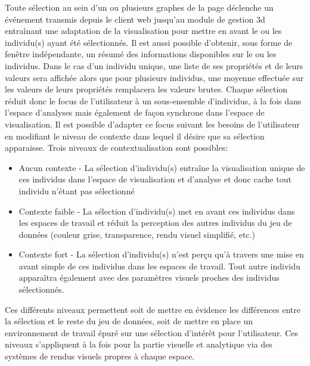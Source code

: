 Toute sélection au sein d'un ou plusieurs graphes de la page déclenche un événement transmis depuis le client web jusqu'au module de gestion 3d entraînant une adaptation de la visualisation pour mettre en avant le ou les individu(s) ayant été sélectionnés. Il est aussi possible d'obtenir, sous forme de fenêtre indépendante, un résumé des informations disponibles sur le ou les individus. Dans le cas d'un individu unique, une liste de ses propriétés et de leurs valeurs sera affichée alors que pour plusieurs individus, une moyenne effectuée sur les valeurs de leurs propriétés remplacera les valeurs brutes.
Chaque sélection réduit donc le focus de l'utilisateur à un sous-ensemble d'individus, à la fois dans l'espace d'analyses mais également de façon synchrone dans l'espace de visualisation. Il est possible d'adapter ce focus suivant les besoins de l'utilisateur en modifiant le niveau de contexte dans lequel il désire que sa sélection apparaisse. Trois niveaux de contextualisation sont possibles:
\begin{itemize}
  \item Aucun contexte - La sélection d'individu(s) entraîne la visualisation unique de ces individus dans l'espace de visualisation et d'analyse et donc cache tout individu n'étant pas sélectionné
  \item Contexte faible - La sélection d'individu(s) met en avant ces individus dans les espaces de travail et réduit la perception des autres individus du jeu de données (couleur grise, transparence, rendu visuel simplifié, etc.)
  \item Contexte fort - La sélection d'individu(s) n'est perçu qu'à travers une mise en avant simple de ces individus dans les espaces de travail. Tout autre individu apparaîtra également avec des paramètres visuels proches des individus sélectionnés.
\end{itemize}

Ces différents niveaux permettent soit de mettre en évidence les différences entre la sélection et le reste du jeu de données, soit de mettre en place un environnement de travail épuré sur une sélection d’intérêt pour l'utilisateur. Ces niveaux s'appliquent à la fois pour la partie visuelle et analytique via des systèmes de rendus visuels propres à chaque espace.

